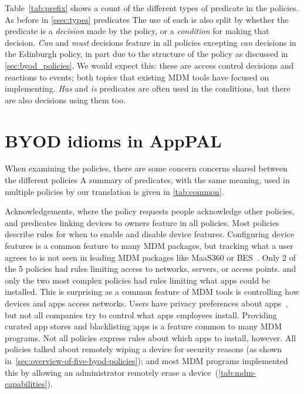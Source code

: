 \documentclass[thesis.tex]{subfiles}
\begin{document}
Table~\ref{tab:prefix} shows a count of the different types of predicate in the policies.
As before in \autoref{ssec:types} predicates The use of each is also split by
whether the predicate is a \emph{decision} made by the policy, or a
\emph{condition} for making that decision. \emph{Can} and \emph{must} decisions
feature in all policies excepting \emph{can} decisions in the Edinburgh policy,
in part due to the structure of the policy as discussed in
\autoref{sec:byod_policies}. We would expect this: these are access control
decisions and reactions to events; both topics that existing \ac{MDM} tools have
focused on implementing. \emph{Has} and \emph{is} predicates are often used in
the conditions, but there are also decisions using them too.


\section{BYOD idioms in AppPAL}
\label{sec:common_concerns}

When examining the policies, there are some concern concerns shared between the different policies
A summary of predicates, with the same meaning, used in multiple policies by our translation is given in \autoref{tab:common}.

Acknowledgements, where the policy requests people acknowledge other policies, and predicates linking devices to owners feature in all policies.
Most policies describe rules for when to enable and disable device features.
Configuring device features is a common feature to many \ac{MDM} packages, but tracking what a user agrees to is not seen in leading \ac{MDM} packages like MaaS360 or BES~\cite{rob_smith_magic_2016}.
Only 2 of the 5 policies had rules limiting access to networks, servers, or access points.
  and only the two most complex policies had rules limiting what apps could be installed.
This is surprising as a common feature of \ac{MDM} tools is controlling how devices and apps access networks.
Users have privacy preferences about apps~\cite{lin_modeling_2014}, but not all companies try to control what apps employees install.
Providing curated app stores and blacklisting apps is a feature common to many \ac{MDM} programs.
Not all policies express rules about which apps to install, however.
All policies talked about remotely wiping a device for security reasons (as shown in~\autoref{sec:overview-of-five-byod-policies});
and most \ac{MDM} programs implemented this by allowing an administrator remotely erase a device~(\autoref{tab:mdm-capabilities}).
\end{document}
